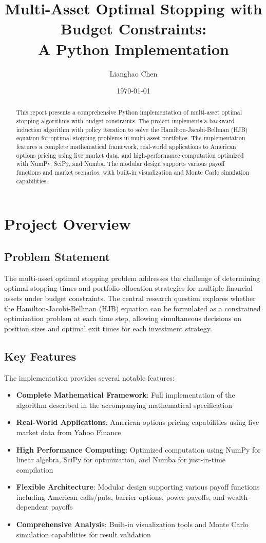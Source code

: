\documentclass[11pt]{article}
\title{Multi-Asset Optimal Stopping with Budget Constraints:\\A Python Implementation}
\author{Lianghao Chen}
\date{\today}
\begin{document}
\maketitle

\begin{abstract}
This report presents a comprehensive Python implementation of multi-asset optimal stopping algorithms with budget constraints. The project implements a backward induction algorithm with policy iteration to solve the Hamilton-Jacobi-Bellman (HJB) equation for optimal stopping problems in multi-asset portfolios. The implementation features a complete mathematical framework, real-world applications to American options pricing using live market data, and high-performance computation optimized with NumPy, SciPy, and Numba. The modular design supports various payoff functions and market scenarios, with built-in visualization and Monte Carlo simulation capabilities.
\end{abstract}

\section{Project Overview}

\subsection{Problem Statement}
The multi-asset optimal stopping problem addresses the challenge of determining optimal stopping times and portfolio allocation strategies for multiple financial assets under budget constraints. The central research question explores whether the Hamilton-Jacobi-Bellman (HJB) equation can be formulated as a constrained optimization problem at each time step, allowing simultaneous decisions on position sizes and optimal exit times for each investment strategy.

\subsection{Key Features}
The implementation provides several notable features:

\begin{itemize}
\item \textbf{Complete Mathematical Framework}: Full implementation of the algorithm described in the accompanying mathematical specification
\item \textbf{Real-World Applications}: American options pricing capabilities using live market data from Yahoo Finance
\item \textbf{High Performance Computing}: Optimized computation using NumPy for linear algebra, SciPy for optimization, and Numba for just-in-time compilation
\item \textbf{Flexible Architecture}: Modular design supporting various payoff functions including American calls/puts, barrier options, power payoffs, and wealth-dependent payoffs
\item \textbf{Comprehensive Analysis}: Built-in visualization tools and Monte Carlo simulation capabilities for result validation
\end{itemize}
\end{document}
